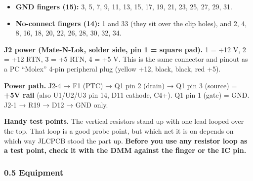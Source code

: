 \documentclass[
  10pt,
]{article}
\providecommand{\tightlist}{%
  \setlength{\itemsep}{0pt}\setlength{\parskip}{0pt}}
\begin{document}
\begin{itemize}
\tightlist
\item
  \textbf{GND fingers (15):} 3, 5, 7, 9, 11, 13, 15, 17, 19,
  21, 23, 25, 27, 29, 31.
\item
  \textbf{No-connect fingers (14):} 1 and 33 (they sit over
  the clip holes), and 2, 4, 8, 16, 18, 20, 22, 26, 28, 30,
  32, 34.
\end{itemize}

\textbf{J2 power (Mate-N-Lok, solder side, pin 1 = square
pad).} 1 = +12 V, 2 = +12 RTN, 3 = +5 RTN, 4 = +5 V. This is
the same connector and pinout as a PC ``Molex'' 4-pin
peripheral plug (yellow +12, black, black, red +5).

\textbf{Power path.} J2-4 → F1 (PTC) → Q1 pin 2 (drain) → Q1
pin 3 (source) = \textbf{+5V rail} (also U1/U2/U3 pin 14,
D11 cathode, C4+). Q1 pin 1 (gate) = GND. J2-1 → R19 → D12 →
GND only.

\textbf{Handy test points.} The vertical resistors stand up
with one lead looped over the top. That loop is a good probe
point, but which net it is on depends on which way JLCPCB
stood the part up. \textbf{Before you use any resistor loop
as a test point, check it with the DMM against the finger or
the IC pin.}

\hypertarget{equipment}{%
\subsubsection{0.5 Equipment}\label{equipment}}
\end{document}
